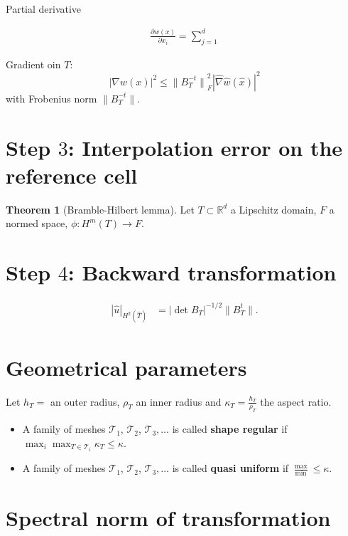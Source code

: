 \documentclass[
	a4paper,
	11pt,
	oneside
]{scrreprt}
\theoremstyle{definition}
\newtheorem{theorem}{Theorem}
\begin{document}
Partial derivative

\begin{align*}
\frac{\partial w\left(x\right)}{\partial x_{i}}=\sum_{j=1}^{d}
\end{align*}

Gradient oin $T$: \[ {\left|\nabla w(x)\right|}^2\le{\|B_{T}^{-t}\|}^{2}_{F}{\left|\hat{\nabla}\hat{w}(\hat{x})\right|}^{2} \] with Frobenius norm $\|B_{T}^{-t}\|$.

\section{Step $3$: Interpolation error on the reference cell}

\begin{theorem}[Bramble-Hilbert lemma]
Let $T\subset\mathbb{R}^{d}$ a Lipschitz domain, $F$ a normed space, $\phi\colon H^{m}\left(T\right)\rightarrow F$.
\end{theorem}

\section{Step $4$: Backward transformation}

\begin{align*}
{\left|\hat{u}\right|}_{H^{2}\left(\hat{T}\right)}&={\left|\operatorname{det}B_{T}\right|}^{-1/2}\|B_{T}^{t}\|.
\end{align*}

\section{Geometrical parameters}

Let $h_{T}=$ an outer radius, $\rho_{T}$ an inner radius and $\kappa_{T}=\frac{h_{T}}{\rho_{T}} $ the aspect ratio.

\begin{itemize}
	\item A family of meshes $\mathcal{T}_{1}$, $\mathcal{T}_{2}$, $\mathcal{T}_{3},\ldots$ is called \textbf{shape regular} if $\max_{i}\max_{T\in\mathcal{T}_{i}}\kappa_{T}\le\kappa$.
	\item A family of meshes $\mathcal{T}_{1}$, $\mathcal{T}_{2}$, $\mathcal{T}_{3},\ldots$ is called \textbf{quasi uniform} if $\frac{\max}{\min}\le\kappa$.
\end{itemize}

\section{Spectral norm of transformation}
\end{document}
